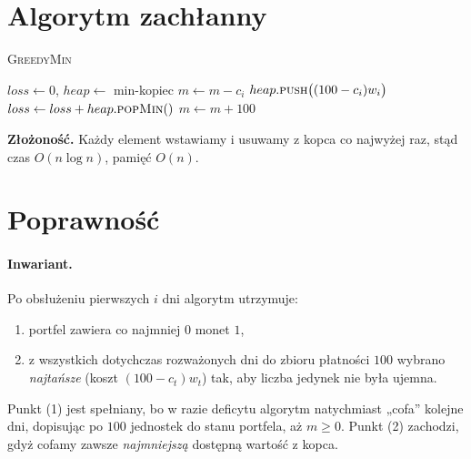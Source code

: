 \documentclass[11pt,a4paper]{article}
\begin{document}
\bigskip
\section*{Algorytm zachłanny}

\begin{algorithm}[H]
\caption{\textsc{GreedyMin}}
\begin{algorithmic}[1]
\State $loss\gets0$, \quad $heap\gets$ min-kopiec
   \State $m\gets m-c_i$ 
   \State $heap.\textsc{push}\bigl((100-c_i)w_i\bigr)$
      \State $loss\gets loss+heap.\textsc{popMin}()$ 
      \State $m\gets m+100$
\EndFor
\State {}
\end{algorithmic}
\end{algorithm}

\medskip
\noindent
\textbf{Złożoność.}
Każdy element wstawiamy i usuwamy z kopca co najwyżej raz,
stąd czas $O(n\log n)$, pamięć $O(n)$.

\medskip
\noindent
\section*{Poprawność}

\paragraph{Inwariant.}
Po obsłużeniu pierwszych $i$ dni algorytm utrzymuje:
\begin{enumerate}
  \item portfel zawiera co najmniej $0$ monet $1$,
  \item z wszystkich dotychczas rozważonych dni do zbioru
        płatności $100$ wybrano \emph{najtańsze} (koszt
        $(100-c_t)w_t$) tak, aby liczba jedynek nie była ujemna.
\end{enumerate}

Punkt (1) jest spełniany, bo w razie deficytu
algorytm natychmiast „cofa” kolejne dni,
dopisując po $100$ jednostek do stanu portfela,
aż $m\ge0$.
Punkt (2) zachodzi, gdyż cofamy zawsze
\emph{najmniejszą} dostępną wartość z kopca.
\end{document}

